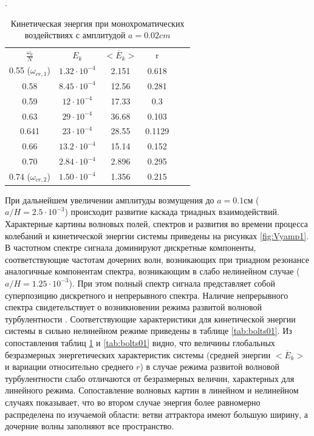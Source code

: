 \begin{table}[h]
	\caption{ Кинетическая энергия при монохроматических воздействиях с амплитудой $a=0.02 cm$}. 
	\begin{center}
		\begin{tabular}{|c|c|c|c|c|c|}
			\hline
			$\displaystyle \frac{\omega_0}{N}$ & $E_k $ &  $<\overline{E}_{k}>$ & r\\
			0.55 ($\omega_{cr,1}$) & $1.32 \cdot 10^{-4}   $& 2.151    & 0.618     \\
			0.58                   & $8.45 \cdot 10^{-4}   $& 12.56    & 0.281     \\
			0.59                   & $ 12  \cdot 10^{-4}   $& 17.33    & 0.3       \\
			0.63                   & $29   \cdot 10^{-4}   $& 36.68    & 0.103     \\
			0.641                  & $23   \cdot 10^{-4}   $& 28.55    & 0.1129    \\
			0.66                   & $13.2 \cdot 10^{-4}   $& 15.14    & 0.152     \\
			0.70                   & $2.84 \cdot 10^{-4}   $& 2.896    & 0.295     \\
			0.74 ($\omega_{cr,2}$) & $1.50 \cdot 10^{-4}   $& 1.356    & 0.215     \\
			\hline
		\end{tabular}
	\end{center}
	\label{tab:bolts002}
\end{table}

При дальнейшем увеличении амплитуды возмущения до $a=0.1$см ($a/H=2.5\cdot 10^{-3}$) происходит развитие каскада триадных взаимодействий. Характерные картины волновых полей, спектров и развития во времени процесса колебаний и кинетической энергии системы приведены на рисунках \ref{fig:Vyamp1}. В частотном спектре сигнала доминируют дискретные компоненты, соответствующие частотам дочерних волн, возникающих при триадном резонансе аналогичные компонентам спектра, возникающим в слабо нелинейном случае ($a/H=1.25\cdot 10^{-3}$). При этом полный спектр сигнала представляет собой суперпозицию дискретного и непрерывного спектра. Наличие непрерывного спектра свидетельствует о возникновении режима развитой волновой турбулентности \cite{Brouzet2016,Brouzetetal2017}. Соответствующие характеристики для кинетической энергии системы в сильно нелинейном режиме приведены в таблице \ref{tab:bolts01}. Из сопоставления таблиц \ref{tab:bolts002} и \ref{tab:bolts01} видно, что величины глобальных безразмерных энергетических характеристик системы (средней энергии  $<\overline{E}_{k}>$ и вариации относительно среднего $r$) в случае режима развитой волновой турбулентности слабо отличаются от безразмерных величин, характерных для линейного режима. Сопоставление волновых картин в линейном и нелинейном случаях показывает, что во втором случае энергия более равномерно распределена по изучаемой области: ветви аттрактора имеют большую ширину, а дочерние волны заполняют все пространство.

